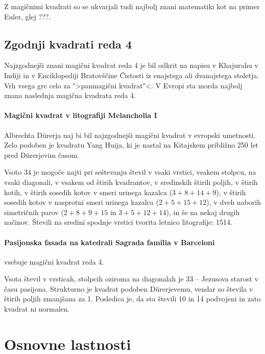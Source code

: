 \documentclass[a4paper,12pt]{article}
\begin{document}
Z magičnimi kvadrati so se ukvarjali tudi najbolj znani matematiki kot na
primer Euler, glej ???. %


\subsection{Zgodnji kvadrati reda 4}

Najzgodnejši znani magični kvadrat reda 4 je bil odkrit na napisu
v Khajurahu v Indiji in v Enciklopediji Bratovščine Čistosti iz enajstega
ali dvanajstega stoletja. Vrh vsega gre celo za ">panmagični kvadrat"<.
V Evropi sta morda najbolj znana naslednja magična kvadrata reda 4.

\paragraph{Magični kvadrat v litografiji Melancholia I}
Albrechta Dürerja naj bi bil najzgodnejši magični kvadrat
v evropski umetnosti. Zelo podoben je kvadratu Yang Huija, ki je nastal na Kitajskem
približno 250 let pred Dürerjevim časom.

Vsoto 34 je mogoče najti pri seštevanju števil v vsaki vrstici, vsakem stolpcu,
na vsaki diagonali, v vsakem od štirih kvadrantov, v sredinskih štirih poljih,
v štirih kotih, v štirih sosedih kotov v smeri urinega kazalca (\(3+8+14+9\)), v
štirih sosedih kotov v nasprotni smeri urinega kazalca (\(2+5+15+12\)), v dveh naborih
simetričnih parov (\(2+8+9+15\) in \(3+5+12+14\)), in še na nekaj drugih načinov.
Števili na sredini spodnje vrstici tvorita letnico litografije: 1514.

\paragraph{Pasijonska fasada na katedrali Sagrada família v Barceloni}
vsebuje magični kvadrat reda 4.

Vsota števil v vrsticah, stolpcih oziroma na diagonalah je 33 -- Jezusova starost
v času pasijona. Strukturno je kvadrat podoben Dürerjevemu, vendar so števila
v štirih poljih zmanjšana za 1. Posledica je, da sta števili 10 in 14 podvojeni
in zato kvadrat ni normalen.


\section{Osnovne lastnosti}
\end{document}
